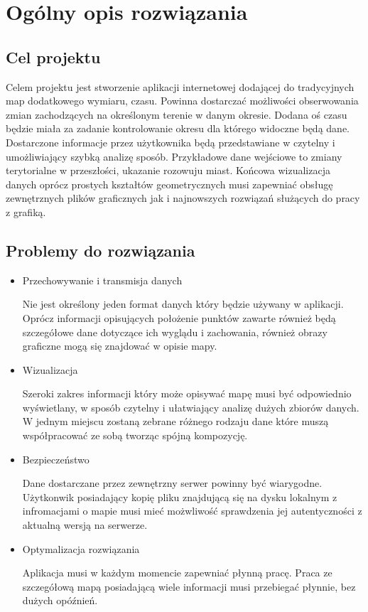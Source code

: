 \chapter{Ogólny opis rozwiązania}
\label{cha:opis}

\section{Cel projektu}
\label{sec:celProjektu}

Celem projektu jest stworzenie aplikacji internetowej dodającej do tradycyjnych map dodatkowego wymiaru, czasu. Powinna dostarczać możliwości obserwowania zmian zachodzących na określonym terenie w danym okresie. Dodana oś czasu będzie miała za zadanie kontrolowanie okresu dla którego widoczne będą dane. Dostarczone informacje przez użytkownika będą przedstawiane w czytelny i umożliwiający szybką analizę sposób. Przykładowe dane wejściowe to zmiany terytorialne w przeszłości, ukazanie rozowuju miast. Końcowa wizualizacja danych oprócz prostych kształtów geometrycznych musi zapewniać obsługę zewnętrznych plików graficznych jak i najnowszych rozwiązań służących do pracy z grafiką.

\section{Problemy do rozwiązania}
\label{sec:problemy}

\begin{itemize}

\item
Przechowywanie i transmisja danych

Nie jest określony jeden format danych który będzie używany w aplikacji. Oprócz informacji opisujących położenie punktów zawarte również będą szczegółowe dane dotyczące ich wyglądu i zachowania, również obrazy graficzne mogą się znajdować w opisie mapy.

\item
Wizualizacja

Szeroki zakres informacji który może opisywać mapę musi być odpowiednio wyświetlany, w sposób czytelny i ułatwiający analizę dużych zbiorów danych. W jednym miejscu zostaną zebrane różnego rodzaju dane które muszą współpracować ze sobą tworząc spójną kompozycję.

\item
Bezpieczeństwo

Dane dostarczane przez zewnętrzny serwer powinny być wiarygodne. Użytkonwik posiadający kopię pliku znajdującą się na dysku lokalnym z infromacjami o mapie musi mieć możwliwość sprawdzenia jej autentyczności z aktualną wersją na serwerze.

\item
Optymalizacja rozwiązania

Aplikacja musi w każdym momencie zapewniać płynną pracę. Praca  ze szczegółową mapą posiadającą wiele informacji musi przebiegać płynnie, bez dużych opóźnień.

\end{itemize}

